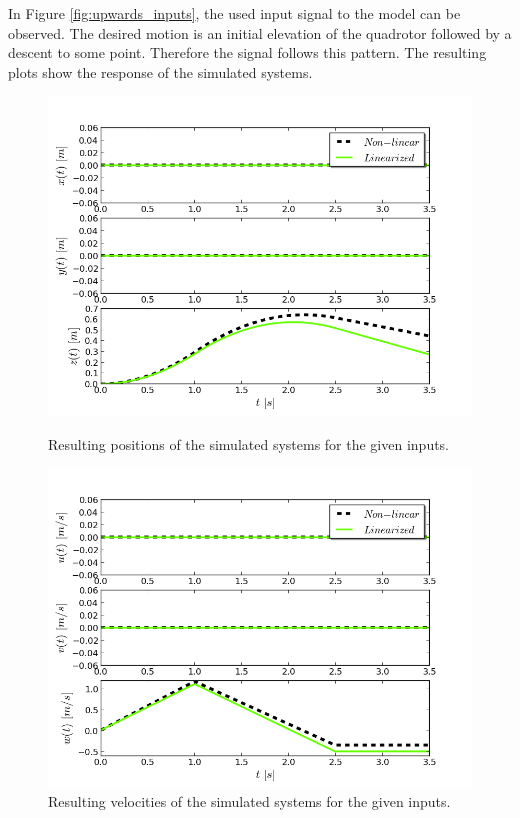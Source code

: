 In Figure \ref{fig:upwards_inputs}, the used input signal to the model can be observed. The desired motion is an initial elevation of the quadrotor followed by a descent to some point. Therefore the signal follows this pattern. The resulting plots show the response of the simulated systems. \\

\begin{figure}[h!]
\centering
\includegraphics[scale=0.7]{Images/Chapter3/Constant_thrust_upwards/Positions.png}
\caption{Resulting positions of the simulated systems for the given inputs.}
\label{fig:upwards_positions}

\includegraphics[scale=0.7]{Images/Chapter3/Constant_thrust_upwards/Linear_velocities.png}
\caption{Resulting velocities of the simulated systems for the given inputs.}
\label{fig:upwards_velocities}
\end{figure}

